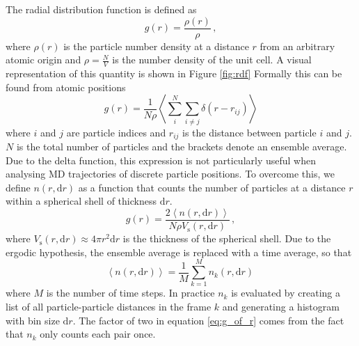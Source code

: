 The radial distribution function is defined as
%
\[ g(r) = \frac{\rho(r)}{\rho} \, , \]
%
where $\rho(r)$ is the particle number density at a distance $r$ from an arbitrary atomic origin and $\rho = \frac{N}{V}$ is the number density of the unit cell. A visual representation of this quantity is shown in Figure \ref{fig:rdf} Formally this can be found from atomic positions
%
\[ g(r) = \frac{1}{N\rho} \left\langle \sum_i^N \sum_{i \neq j} \delta(r - r_{ij})  \right\rangle \]
%
where $i$ and $j$ are particle indices and $r_{ij}$ is the distance between particle $i$ and $j$. $N$ is the total number of particles and the brackets denote an ensemble average. Due to the delta function, this expression is not particularly useful when analysing MD trajectories of discrete particle positions. To overcome this, we define $n(r,\mathrm{d}r)$ as a function that counts the number of particles at a distance $r$ within a spherical shell of thickness $\mathrm{d}r$.
%
\begin{equation}\label{eq:g_of_r}
g(r) = \frac{2 \left\langle n(r,\mathrm{d}r) \right\rangle}{N \rho V_\text{s}(r,\mathrm{d}r)} \, ,
\end{equation}
%
where $V_\text{s}(r,\mathrm{d}r) \approx 4 \pi r^2 \mathrm{d}r$ is the thickness of the spherical shell. Due to the ergodic hypothesis, the ensemble average is replaced with a time average, so that 
%
\[ \left\langle n(r,\mathrm{d}r) \right\rangle = \frac{1}{M} \sum_{k=1}^M n_k(r,\mathrm{d}r) \, \]
%
where $M$ is the number of time steps. In practice $n_k$ is evaluated by creating a list of all particle-particle distances in the frame $k$ and generating a histogram with bin size $\mathrm{d}r$. The factor of two in equation \eqref{eq:g_of_r} comes from the fact that $n_k$ only counts each pair once.

